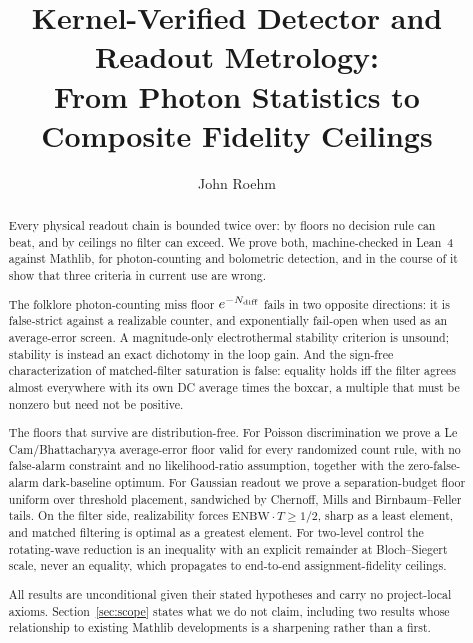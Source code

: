 \documentclass[aps,prx,reprint,nofootinbib,superscriptaddress]{revtex4-2}
\newcommand{\Lean}{Lean~4}
\begin{document}
\title{Kernel-Verified Detector and Readout Metrology:\\
From Photon Statistics to Composite Fidelity Ceilings}

\author{John Roehm}

\begin{abstract}
Every physical readout chain is bounded twice over: by floors no decision rule can beat,
and by ceilings no filter can exceed. We prove both, machine-checked in \Lean{} against
Mathlib, for photon-counting and bolometric detection, and in the course of it show
that three criteria in current use are wrong.

The folklore photon-counting miss floor $e^{-N_{\rm diff}}$ fails in two opposite
directions: it is false-strict against a realizable counter, and exponentially fail-open
when used as an average-error screen. A magnitude-only electrothermal stability criterion
is unsound; stability is instead an exact dichotomy in the loop gain. And the sign-free
characterization of matched-filter saturation is false: equality holds iff the filter
agrees almost everywhere with its own DC average times the boxcar, a multiple that must be
nonzero but need not be positive.

The floors that survive are distribution-free. For Poisson discrimination we prove a
Le Cam/Bhattacharyya average-error floor valid for every randomized count rule, with no
false-alarm constraint and no likelihood-ratio assumption, together with the zero-false-alarm
dark-baseline optimum. For Gaussian readout we prove a separation-budget floor uniform over
threshold placement, sandwiched by Chernoff, Mills and Birnbaum--Feller tails. On the filter
side, realizability forces $\mathrm{ENBW}\cdot T \ge 1/2$, sharp as a least element, and
matched filtering is optimal as a greatest element. For two-level control the rotating-wave
reduction is an inequality with an explicit remainder at Bloch--Siegert scale, never an
equality, which propagates to end-to-end assignment-fidelity ceilings.

All results are unconditional given their stated hypotheses and carry no project-local
axioms. Section~\ref{sec:scope} states what we do not claim, including two results whose
relationship to existing Mathlib developments is a sharpening rather than a first.
\end{abstract}

\maketitle
\end{document}
